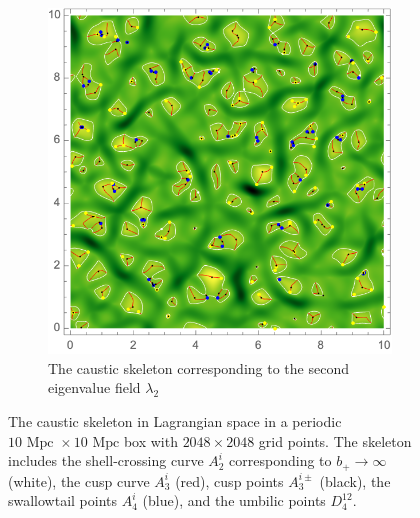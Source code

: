 \documentclass[a4paper, 11pt]{article}
\begin{document}
\begin{figure}
\begin{subfigure}[b]{0.49\textwidth}
\includegraphics[width=\textwidth]{Lambda2}
\caption{The caustic skeleton corresponding to the second eigenvalue field $\lambda_2$}
\end{subfigure}
\caption{The caustic skeleton in Lagrangian space in a periodic $10\text{ Mpc } \times 10 \text{ Mpc}$ box with $2048 \times 2048$ grid points. The skeleton includes the shell-crossing curve $A_2^i$ corresponding to $b_+ \to \infty$ (white), the cusp curve $A_3^i$ (red), cusp points $A_3^{i\pm}$ (black), the swallowtail points $A_4^i$ (blue), and the umbilic points $D_4^{12}$.}
\label{fig:NumericalExample}
\vspace{1cm}
%
\end{figure}
\end{document}
